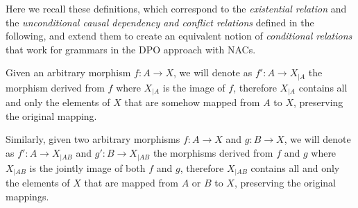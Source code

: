 Here we recall these definitions, which correspond to the \emph{existential relation} and the \emph{unconditional causal dependency and conflict relations} defined in the following, and extend them to create an equivalent notion of \emph{conditional relations} that work for grammars in the DPO approach with NACs.

\begin{notation} Given an arbitrary morphism $f : A \rightarrow X$, we will denote as $f' : A \rightarrow X_{|A}$ the morphism derived from $f$ where $X_{|A}$ is the image of $f$, therefore $X_{|A}$ contains all and only the elements of $X$ that are somehow mapped from $A$ to $X$, preserving the original mapping.

  Similarly, given two arbitrary morphisms $f : A \rightarrow X$ and $g : B \rightarrow X$, we will denote as $f' : A \rightarrow X_{|AB}$ and $g' : B \rightarrow X_{|AB}$ the morphisms derived from $f$ and $g$ where $X_{|AB}$ is the jointly image of both $f$ and $g$, therefore $X_{|AB}$ contains all and only the elements of $X$ that are mapped from $A$ or $B$ to $X$, preserving the original mappings.
\end{notation}

